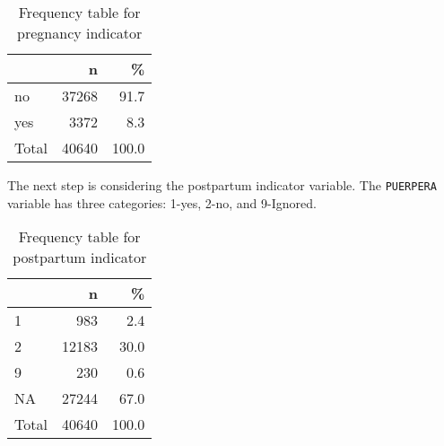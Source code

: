 \documentclass[
]{article}
\newenvironment{Shaded}{\begin{snugshade}}{\end{snugshade}}
\newcommand{\DataTypeTok}[1]{\textcolor[rgb]{0.13,0.29,0.53}{#1}}
\newcommand{\DecValTok}[1]{\textcolor[rgb]{0.00,0.00,0.81}{#1}}
\newcommand{\KeywordTok}[1]{\textcolor[rgb]{0.13,0.29,0.53}{\textbf{#1}}}
\newcommand{\NormalTok}[1]{#1}
\newcommand{\OperatorTok}[1]{\textcolor[rgb]{0.81,0.36,0.00}{\textbf{#1}}}
\newcommand{\OtherTok}[1]{\textcolor[rgb]{0.56,0.35,0.01}{#1}}
\newcommand{\StringTok}[1]{\textcolor[rgb]{0.31,0.60,0.02}{#1}}
\begin{document}
\begin{table}[!h]

\caption{\label{tab:unnamed-chunk-12}Frequency table for pregnancy indicator}
\centering
\begin{tabular}[t]{l|r|r}
\hline
  & n & \%\\
\hline
no & 37268 & 91.7\\
\hline
yes & 3372 & 8.3\\
\hline
Total & 40640 & 100.0\\
\hline
\end{tabular}
\end{table}

The next step is considering the postpartum indicator variable. The
\texttt{PUERPERA} variable has three categories: 1-yes, 2-no, and
9-Ignored.

\begin{Shaded}
\end{Shaded}

\begin{table}[!h]

\caption{\label{tab:unnamed-chunk-13}Frequency table for postpartum indicator}
\centering
\begin{tabular}[t]{l|r|r}
\hline
  & n & \%\\
\hline
1 & 983 & 2.4\\
\hline
2 & 12183 & 30.0\\
\hline
9 & 230 & 0.6\\
\hline
NA & 27244 & 67.0\\
\hline
Total & 40640 & 100.0\\
\hline
\end{tabular}
\end{table}
\end{document}
